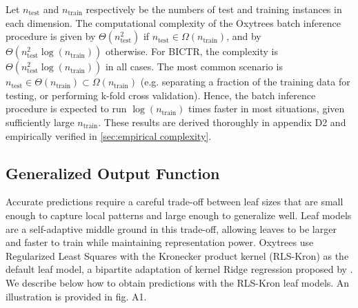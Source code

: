\documentclass[letterpaper]{article}
\begin{document}
Let $n_\text{test}$ and $n_\text{train}$ respectively be the numbers of test and training instances in each dimension.
The computational complexity of the Oxytrees batch inference procedure is given by
$\Theta(n_\text{test}^2)$ if $n_\text{test} \in \Omega(n_\text{train})$, and by $\Theta(n^2_\text{test} \log(n_\text{train}))$ otherwise.
For BICTR, the complexity is $\Theta(n^2_\text{test} \log(n_\text{train}))$ in all cases.
The most common scenario is $n_\text{test} \in \Theta(n_\text{train}) \subset \Omega(n_\text{train})$ (e.g. separating a fraction of the training data for testing, or performing k-fold cross validation). Hence, the batch inference procedure is expected to run $\log (n_\text{train})$ times faster in most situations, given sufficiently large $n_\text{train}$.
These results are derived thoroughly in
appendix D2
and empirically verified in \cref{sec:empirical complexity}.

\subsection{Generalized Output Function}
\label{sec:paulownias output function}

Accurate predictions require a careful trade-off between leaf sizes that are small enough to capture local patterns and large enough to generalize well.
Leaf models are a self-adaptive middle ground in this trade-off, allowing leaves to be larger and faster to train while maintaining representation power.
Oxytrees use Regularized Least Squares with the Kronecker product kernel (RLS-Kron) as the default leaf model, a bipartite adaptation of kernel Ridge regression proposed by \citet{van_laarhoven_gaussian_2011}.
We describe below how to obtain predictions with the RLS-Kron leaf models. An illustration is provided in
fig. A1.
\end{document}
